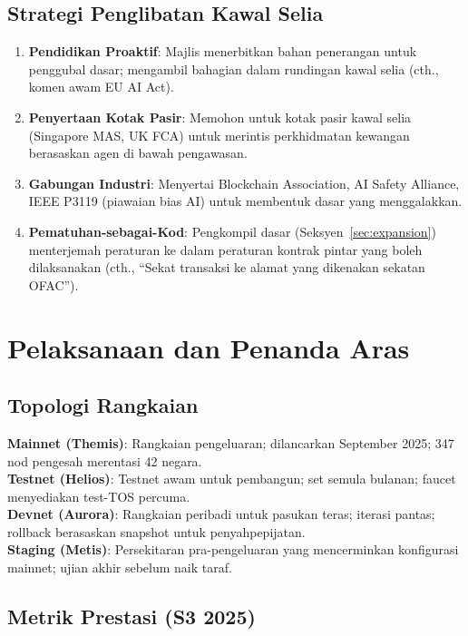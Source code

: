 \documentclass[11pt]{article}
\begin{document}
\subsection{Strategi Penglibatan Kawal Selia}

\begin{enumerate}[noitemsep]
  \item \textbf{Pendidikan Proaktif}: Majlis menerbitkan bahan penerangan untuk penggubal dasar; mengambil bahagian dalam rundingan kawal selia (cth., komen awam EU AI Act).
  \item \textbf{Penyertaan Kotak Pasir}: Memohon untuk kotak pasir kawal selia (Singapore MAS, UK FCA) untuk merintis perkhidmatan kewangan berasaskan agen di bawah pengawasan.
  \item \textbf{Gabungan Industri}: Menyertai Blockchain Association, AI Safety Alliance, IEEE P3119 (piawaian bias AI) untuk membentuk dasar yang menggalakkan.
  \item \textbf{Pematuhan-sebagai-Kod}: Pengkompil dasar (Seksyen~\ref{sec:expansion}) menterjemah peraturan ke dalam peraturan kontrak pintar yang boleh dilaksanakan (cth., ``Sekat transaksi ke alamat yang dikenakan sekatan OFAC'').
\end{enumerate}

\section{Pelaksanaan dan Penanda Aras}
\label{sec:implementation}

\subsection{Topologi Rangkaian}

\textbf{Mainnet (Themis)}: Rangkaian pengeluaran; dilancarkan September 2025; 347 nod pengesah merentasi 42 negara.\\
\textbf{Testnet (Helios)}: Testnet awam untuk pembangun; set semula bulanan; faucet menyediakan test-TOS percuma.\\
\textbf{Devnet (Aurora)}: Rangkaian peribadi untuk pasukan teras; iterasi pantas; rollback berasaskan snapshot untuk penyahpepijatan.\\
\textbf{Staging (Metis)}: Persekitaran pra-pengeluaran yang mencerminkan konfigurasi mainnet; ujian akhir sebelum naik taraf.

\subsection{Metrik Prestasi (S3 2025)}
\end{document}
